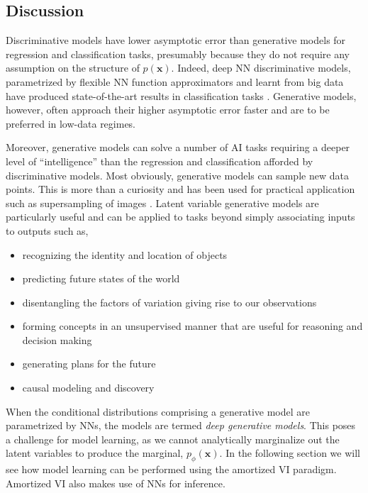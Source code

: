 \subsection{Discussion}
Discriminative models have lower asymptotic error than generative models for regression and classification tasks, presumably because they do not require any assumption on the structure of $p(\mathbf{x})$. Indeed, deep NN discriminative models, parametrized by flexible NN function approximators and learnt from big data have produced state-of-the-art results in classification tasks \citep{KrizhevskyEtAl2012, HintonEtAl2012}. Generative models, however, often approach their higher asymptotic error faster \citep{ng2002discriminative} and are to be preferred in low-data regimes.

Moreover, generative models can solve a number of AI tasks requiring a deeper level of ``intelligence'' than the regression and classification afforded by discriminative models. Most obviously, generative models can sample new data points. This is more than a curiosity and has been used for practical application such as supersampling of images \citep{ledig2017photo}. Latent variable generative models are particularly useful and can be applied to tasks beyond simply associating inputs to outputs \citep{mohamed2017tutorial} such as,
\begin{itemize}
	\item recognizing the identity and location of objects \citep{eslami2016attend}
	\item predicting future states of the world \citep{kosiorek2018sequential}
	\item disentangling the factors of variation giving rise to our observations \citep{SiddharthEtAl2017}
	\item forming concepts in an unsupervised manner that are useful for reasoning and decision making \citep{lake2015human}
	\item generating plans for the future \citep{igl2018deep}
	\item causal modeling and discovery \citep{louizos2017causal}
\end{itemize}

When the conditional distributions comprising a generative model are parametrized by NNs, the models are termed \emph{deep generative models}. This poses a challenge for model learning, as we cannot analytically marginalize out the latent variables to produce the marginal, $p_\phi(\mathbf{x})$. In the following section we will see how model learning can be performed using the amortized VI paradigm. Amortized VI also makes use of NNs for inference.

